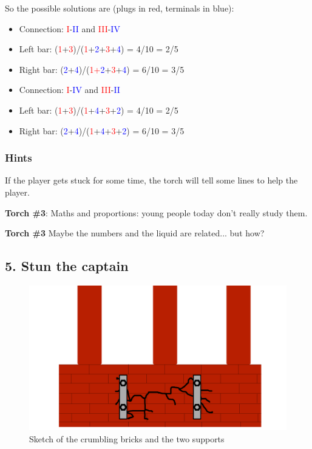 So the possible solutions are (plugs in red, terminals in blue):
\begin{itemize}
	\item Connection: \textcolor{red}{I}-\textcolor{blue}{II} and \textcolor{red}{III}-\textcolor{blue}{IV}
	\item Left bar: (\textcolor{red}{1}+\textcolor{red}{3})/(\textcolor{red}{1}+\textcolor{blue}{2}+\textcolor{red}{3}+\textcolor{blue}{4}) = 4/10 = 2/5
	\item Right bar: (\textcolor{blue}{2}+\textcolor{blue}{4})/(\textcolor{red}{1+\textcolor{blue}{2}}+\textcolor{red}{3}+\textcolor{blue}{4}) = 6/10 = 3/5
\end{itemize}

\begin{itemize}
	\item Connection: \textcolor{red}{I}-\textcolor{blue}{IV} and \textcolor{red}{III}-\textcolor{blue}{II}
	\item Left bar: (\textcolor{red}{1}+\textcolor{red}{3})/(\textcolor{red}{1}+\textcolor{blue}{4}+\textcolor{red}{3}+\textcolor{blue}{2}) = 4/10 = 2/5
	\item Right bar: (\textcolor{blue}{2}+\textcolor{blue}{4})/(\textcolor{red}{1}+\textcolor{blue}{4}+\textcolor{red}{3}+\textcolor{blue}{2}) = 6/10 = 3/5
\end{itemize}

\subsubsection*{Hints}
If the player gets stuck for some time, the torch will tell some lines to help the player.

\textbf{Torch \#{}3}: Maths and proportions: young people today don't really study them.

\textbf{Torch \#{}3} Maybe the numbers and the liquid are related... but how? 


\subsection{5. Stun the captain}

\begin{figure}[H]
  \centering
  \includegraphics[width=\textwidth]{Images/Puzzles/castleOfDynamia5}
  \caption{Sketch of the crumbling bricks and the two supports}
\end{figure}

